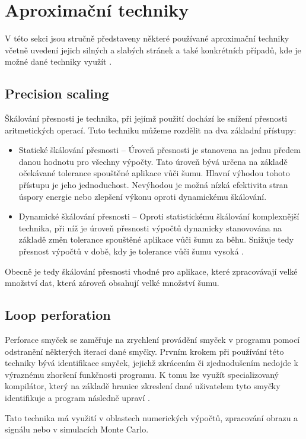 \section{Aproximační techniky}
V této sekci jsou stručně představeny některé používané aproximační techniky včetně uvedení jejich silných a slabých stránek a také konkrétních případů, kde je možné dané techniky využít \cite{ac_techniques}.

\subsection*{Precision scaling}
Škálování přesnosti je technika, při jejímž použití dochází ke snížení přesnosti aritmetických operací. Tuto techniku můžeme rozdělit na dva základní přístupy:
\begin{itemize}
    \item Statické škálování přesnosti -- Úroveň přesnosti je stanovena na jednu předem danou hodnotu pro všechny výpočty. Tato úroveň bývá určena na základě očekávané tolerance spouštěné aplikace vůči šumu. Hlavní výhodou tohoto přístupu je jeho jednoduchost. Nevýhodou je možná nízká efektivita stran úspory energie nebo zlepšení výkonu oproti dynamickému škálování.
    \item Dynamické škálování přesnosti -- Oproti statistickému škálování komplexnější technika, při níž je úroveň přesnosti výpočtů dynamicky stanovována na základě změn tolerance spouštěné aplikace vůči šumu za běhu. Snižuje tedy přesnost výpočtů v době, kdy je tolerance vůči šumu vysoká \cite{precision_scaling}.
\end{itemize}

Obecně je tedy škálování přesnosti vhodné pro aplikace, které zpracovávají velké množství dat, která zároveň obsahují velké množství šumu.

\subsection*{Loop perforation}
Perforace smyček se zaměřuje na zrychlení provádění smyček v programu pomocí odstranění některých iterací dané smyčky. Prvním krokem při používání této techniky bývá identifikace smyček, jejichž zkrácením či zjednodušením nedojde k výraznému zhoršení funkčnosti programu. K tomu lze využít specializovaný kompilátor, který na základě hranice zkreslení dané uživatelem tyto smyčky identifikuje a program následně upraví \cite{code_perforation}.

Tato technika má využití v oblastech numerických výpočtů, zpracování obrazu a signálu nebo v simulacích Monte Carlo.


